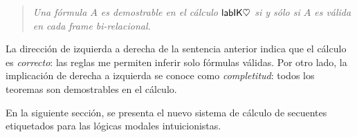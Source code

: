 \begin{quote}
 \emph{Una fórmula $A$ es demostrable en el cálculo $\mathsf{labIK\heartsuit}$ si y sólo si $A$ es válida en cada frame bi-relacional.}
\end{quote}

La dirección de izquierda a derecha de la sentencia anterior indica que el cálculo es \emph{correcto}: las reglas me permiten inferir solo fórmulas válidas. Por otro lado, la implicación de derecha a izquierda se conoce como \emph{completitud}: todos los teoremas son demostrables en el cálculo.

En la siguiente sección, se presenta el nuevo sistema de cálculo de secuentes etiquetados para las lógicas modales intuicionistas. 

